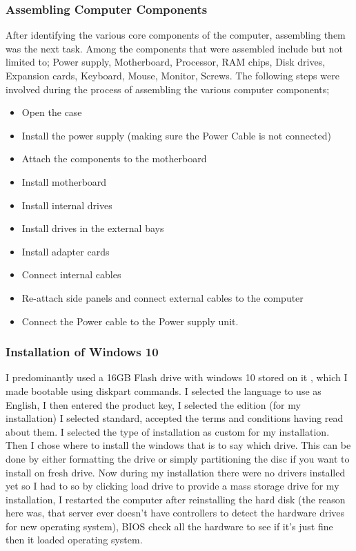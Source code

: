 \documentclass{article}
\begin{document}
\subsubsection{Assembling Computer Components}
After identifying the various core components of the computer, assembling them was the next task. Among the components that were assembled include but not limited to; Power supply, Motherboard, Processor, RAM chips, Disk drives, Expansion cards, Keyboard, Mouse, Monitor, Screws.
The following steps were involved during the process of assembling the various computer components;
\begin{itemize}
\item Open the case
\item  Install the power supply (making sure the Power Cable is not connected)
\item Attach the components to the motherboard
\item  Install motherboard
\item Install internal drives
\item Install drives in the external bays
\item Install adapter cards
\item Connect internal cables
\item Re-attach side panels and connect external cables to the computer
\item Connect the Power cable to the Power supply unit.
\end{itemize}
\subsubsection{Installation of Windows 10}
I predominantly used a 16GB Flash drive with windows 10 stored on it , which I made bootable  using diskpart commands. I selected the language to use as English, I then entered the product key, I selected the edition (for my installation) I selected standard, accepted the terms and conditions having read about them. I selected the type of installation as custom for my installation. Then I chose where to install the windows that is to say  which drive. This can be done by either formatting the drive or simply partitioning the disc if you want to install on fresh drive. Now during my installation there were no drivers installed yet so I had to so by clicking load drive to provide a mass storage drive for my installation, I restarted the computer after
reinstalling the hard disk (the reason here was, that server ever doesn’t have controllers to detect the hardware drives for new operating system), BIOS check all the hardware to see if it’s just fine then it loaded operating system.
\end{document}
